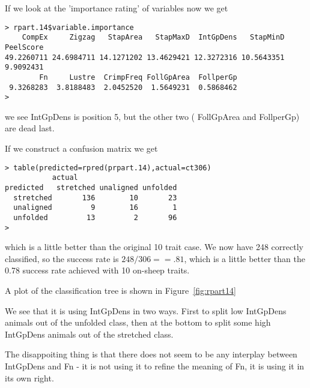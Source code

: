\documentclass[titlepage]{article}  %
\begin{document}
If we look at the 'importance rating' of variables now we get
\begin{verbatim}
> rpart.14$variable.importance
    CompEx     Zigzag   StapArea   StapMaxD  IntGpDens   StapMinD  PeelScore 
49.2260711 24.6984711 14.1271202 13.4629421 12.3272316 10.5643351  9.9092431 
        Fn     Lustre  CrimpFreq FollGpArea  FollperGp 
 9.3268283  3.8188483  2.0452520  1.5649231  0.5868462 
> 
\end{verbatim}
 we see IntGpDens is position 5, but the other two ( FollGpArea and FollperGp) are dead last.

If we construct a confusion matrix we get
\begin{verbatim}
> table(predicted=rpred(prpart.14),actual=ct306)
           actual
predicted   stretched unaligned unfolded
  stretched       136        10       23
  unaligned         9        16        1
  unfolded         13         2       96
> 
\end{verbatim}
which is a little better than the original 10 trait case. We now have 248 correctly classified, so the success rate is $248/306==.81$, which is a little better than the 0.78 success rate achieved with 10 on-sheep traits.

A plot of the classification tree is shown in Figure~\ref{fig:rpart14}

We see that it is using IntGpDens in two ways. First to split low IntGpDens animals out of the unfolded class, then at the bottom to split some high IntGpDens animals out of the stretched class. 

The disappoiting thing is that there does not seem to be any interplay between 
IntGpDens and Fn - it is not using it to refine the meaning of Fn, it is using it in its own right.
\end{document}

